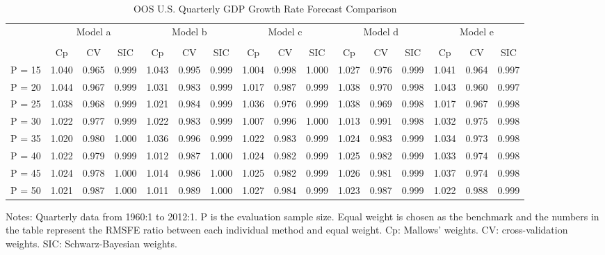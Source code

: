 \begin{table}
    \caption{OOS U.S. Quarterly GDP Growth Rate Forecast Comparison} \label{ntb:3}
    \centering
    \begin{adjustbox}{width=\textwidth,totalheight=\textheight,keepaspectratio}
    \begin{threeparttable}
    \begin{tabular}{lccccccccccccccc}
    \toprule
     & \multicolumn{3}{c}{Model a} & \multicolumn{3}{c}{Model b} & \multicolumn{3}{c}{Model c} & \multicolumn{3}{c}{Model d} & \multicolumn{3}{c}{Model e}\\%
    \cmidrule(r){2-4}
    \cmidrule(r){5-7}
    \cmidrule(r){8-10}
    \cmidrule(r){11-13}
    \cmidrule(r){14-16}\\
           & Cp    & CV    & SIC  & Cp    & CV    & SIC & Cp    & CV    & SIC & Cp    & CV    & SIC & Cp    & CV    & SIC \\
    P = 15 & 1.040 & 0.965 & 0.999& 1.043 & 0.995 &0.999& 1.004 & 0.998 &1.000& 1.027 & 0.976 &0.999& 1.041 & 0.964 &0.997 \\
    P = 20 & 1.044 & 0.967 & 0.999& 1.031 & 0.983 &0.999& 1.017 & 0.987 &0.999& 1.038 & 0.970 &0.998& 1.043 & 0.960 &0.997 \\
    P = 25 & 1.038 & 0.968 & 0.999& 1.021 & 0.984 &0.999& 1.036 & 0.976 &0.999& 1.038 & 0.969 &0.998& 1.017 & 0.967 &0.998 \\
    P = 30 & 1.022 & 0.977 & 0.999& 1.022 & 0.983 &0.999& 1.007 & 0.996 &1.000& 1.013 & 0.991 &0.998& 1.032 & 0.975 &0.998 \\
    P = 35 & 1.020 & 0.980 & 1.000& 1.036 & 0.996 &0.999& 1.022 & 0.983 &0.999& 1.024 & 0.983 &0.999& 1.034 & 0.973 &0.998 \\
    P = 40 & 1.022 & 0.979 & 0.999& 1.012 & 0.987 &1.000& 1.024 & 0.982 &0.999& 1.025 & 0.982 &0.999& 1.033 & 0.974 &0.998 \\
    P = 45 & 1.024 & 0.978 & 1.000& 1.014 & 0.986 &1.000& 1.025 & 0.982 &0.999& 1.026 & 0.981 &0.999& 1.037 & 0.974 &0.998 \\
    P = 50 & 1.021 & 0.987 & 1.000& 1.011 & 0.989 &1.000& 1.027 & 0.984 &0.999& 1.023 & 0.987 &0.999& 1.022 & 0.988 &0.999 \\
    \bottomrule
    \end{tabular}
    \begin{tablenotes} \footnotesize
    Notes: Quarterly data from 1960:1 to 2012:1. $\mathrm{P}$ is the evaluation sample size. Equal weight is chosen as the benchmark and the numbers in the table represent the RMSFE ratio between each individual method and equal weight. Cp: Mallows' weights. CV: cross-validation weights. SIC: Schwarz-Bayesian weights.

\end{tablenotes}
\end{threeparttable}
\end{adjustbox}
\end{table}
